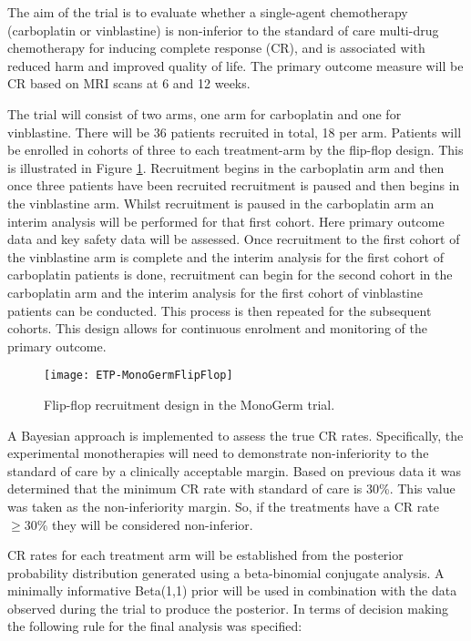 The aim of the trial is to evaluate whether a single-agent chemotherapy (carboplatin or vinblastine) is non-inferior to	the standard of care multi-drug chemotherapy for inducing complete response (CR), and is associated with reduced harm and improved quality of life. The primary outcome measure will be CR based on MRI scans at 6 and 12 weeks. 

The trial will consist of two arms, one arm for carboplatin and one for vinblastine. There will be 36 patients recruited in total, 18 per arm. Patients will be enrolled in cohorts of three to each treatment-arm by the flip-flop design. This is illustrated in Figure \ref{fig_etp:MonoGermFlipFlop}. Recruitment begins in the carboplatin arm and then once three patients have been recruited recruitment is paused and then begins in the vinblastine arm. Whilst recruitment is paused in the carboplatin arm an interim analysis will be performed for that first cohort. Here primary outcome data and key safety data will be assessed. Once recruitment to the first cohort of the vinblastine arm is complete and the interim analysis for the first cohort of carboplatin patients is done, recruitment can begin for the second cohort in the carboplatin arm and the interim analysis for the first cohort of vinblastine patients can be conducted. This process is then repeated for the subsequent cohorts. This design allows for continuous enrolment and monitoring of the primary outcome. 

\begin{figure}[h!]
	\centering
	\caption{Flip-flop recruitment design in the MonoGerm trial.}
	\label{fig_etp:MonoGermFlipFlop}
	\texttt{[image: ETP-MonoGermFlipFlop]}
\end{figure}

A Bayesian approach is implemented to assess the true CR rates. Specifically, the experimental monotherapies will need to demonstrate non-inferiority to the standard of care by a clinically acceptable margin. Based on previous data it was determined that the minimum CR rate with standard of care is 30\%. This value was taken as the non-inferiority margin. So, if the treatments have a CR rate $\geq30$\% they will be considered non-inferior. 

CR rates for each treatment arm will be established from the posterior probability distribution generated using a beta-binomial conjugate analysis. A minimally informative Beta(1,1) prior will be used in combination with the data observed during the trial to produce the posterior. In terms of decision making the following rule for the final analysis was specified: 

